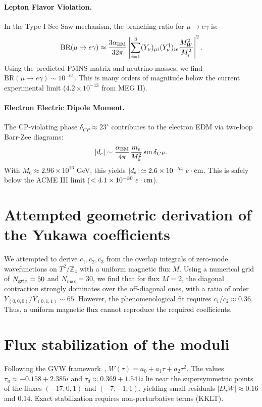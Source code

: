 \documentclass[12pt,a4paper]{article}
\numberwithin{equation}{section}
\begin{document}
\paragraph{Lepton Flavor Violation.}
In the Type-I See-Saw mechanism, the branching ratio for \(\mu \to e \gamma\) is:
\begin{equation}
\text{BR}(\mu \to e \gamma) \approx \frac{3\alpha_{\rm EM}}{32\pi} \left| \sum_{i=1}^3 (Y_\nu)_{\mu i} (Y_\nu^\dagger)_{i e} \frac{M_W^2}{M_i^2} \right|^2.
\end{equation}
Using the predicted PMNS matrix and neutrino masses, we find $\text{BR}(\mu \to e \gamma) \sim 10^{-61}$. This is many orders of magnitude below the current experimental limit ($4.2 \times 10^{-13}$ from MEG II).

\paragraph{Electron Electric Dipole Moment.}
The CP-violating phase $\delta_{CP} \approx 23^\circ$ contributes to the electron EDM via two-loop Barr-Zee diagrams:
\begin{equation}
|d_e| \sim \frac{\alpha_{\rm EM}}{4\pi} \frac{m_e}{M_6^2} \sin\delta_{CP}.
\end{equation}
With \(M_6 \approx 2.96 \times 10^{16}\) GeV, this yields \(|d_e| \simeq 2.6 \times 10^{-54}~e\cdot{\rm cm}\). This is safely below the ACME III limit (\(< 4.1 \times 10^{-30}~e\cdot{\rm cm}\)).

\section{Attempted geometric derivation of the Yukawa coefficients}
\label{sec:negative_flux}
We attempted to derive \(c_1, c_2, c_3\) from the overlap integrals of zero-mode wavefunctions on \(T^2/\mathbb{Z}_4\) with a uniform magnetic flux \(M\).
Using a numerical grid of \(N_{\rm grid} = 50\) and \(N_{\max} = 30\), we find that for flux \(M=2\), the diagonal contraction strongly dominates over the off-diagonal ones, with a ratio of order \(Y_{(0,0,0)}/Y_{(0,1,1)} \sim 65\). However, the phenomenological fit requires \(c_1/c_2 \approx 0.36\). Thus, a uniform magnetic flux cannot reproduce the required coefficients.

\section{Flux stabilization of the moduli}
Following the GVW framework~\cite{GVW2000}, \(W(\tau) = a_0 + a_1 \tau + a_2 \tau^2\). The values \(\tau_u \approx -0.158 + 2.385i\) and \(\tau_d \approx 0.369 + 1.541i\) lie near the supersymmetric points of the fluxes \((-17, 0, 1)\) and \((-7, -1, 1)\), yielding small residuals \(|D_\tau W| \approx 0.16\) and \(0.14\). Exact stabilization requires non-perturbative terms (KKLT).
\end{document}
